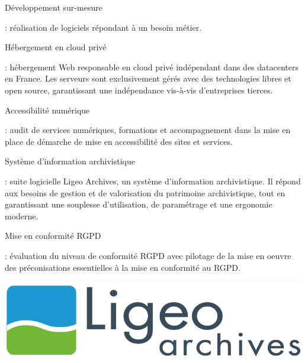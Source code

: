 \documentclass[12pt, a4paper, twoside]{article}
\begin{document}
\noindent%
\begin{minipage}{.7\textwidth}%

\begin{hilite}Développement sur-mesure\end{hilite}: réalisation de logiciels répondant à un besoin métier.

\begin{hilite}Hébergement en cloud privé\end{hilite}: hébergement Web responsable en \gls{cloud privé} indépendant dans des datacenters en France. 
Les serveurs sont exclusivement gérés avec des technologies libres et open source, garantissant une indépendance vis-à-vis d'entreprises tierces.

\begin{hilite}Accessibilité numérique\end{hilite}: audit de services numériques, formations et accompagnement dans la mise en place de démarche de mise en accessibilité des sites et services.

\begin{hilite}Système d'information archivistique\end{hilite}: suite logicielle Ligeo Archives, un système d'information archivistique. 
Il répond aux besoins de gestion et de valorisation du patrimoine archivistique, tout en garantissant une souplesse d'utilisation, de paramétrage et une ergonomie moderne.

\begin{hilite}Mise en conformité \gls{RGPD}\end{hilite}: évaluation du niveau de conformité \gls{RGPD} avec pilotage de la mise en oeuvre des préconisations essentielles à la mise en conformité au \gls{RGPD}.

\end{minipage}%
\hfill
\begin{minipage}{.3\textwidth}%
\begin{center}
    \includegraphics[scale=0.2]{src/logo_ligeo.png}
\end{center}
\end{minipage}%
\end{document}
